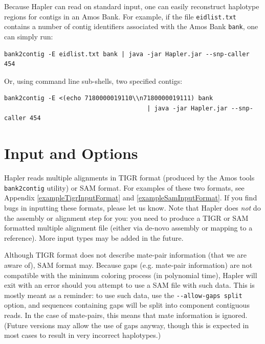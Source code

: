 \documentclass[11pt]{llncs}
\begin{document}
Because Hapler can read on standard input, one can easily reconstruct haplotype regions for contigs in an Amos Bank. 
For example, if the file \texttt{eidlist.txt} contains a number of contig identifiers
associated with the Amos Bank \texttt{bank}, one can simply run:

\begin{verbatim}
bank2contig -E eidlist.txt bank | java -jar Hapler.jar --snp-caller 454
\end{verbatim}

Or, using command line sub-shells, two specified contigs:

\begin{verbatim}
bank2contig -E <(echo 7180000019110\\n7180000019111) bank 
                                       | java -jar Hapler.jar --snp-caller 454
\end{verbatim}



\newpage

\section{Input and Options}
\label{inputAndOptions}

Hapler reads multiple alignments in TIGR format (produced by the Amos tools \verb=bank2contig= utility) or SAM format. For examples of these two 
formats, see Appendix \ref{exampleTigrInputFormat} and \ref{exampleSamInputFormat}. If you find bugs in inputting these formats, please let us know. 
Note that Hapler does \emph{not} do the assembly or alignment step for you: you need to produce a TIGR or SAM formatted multiple alignment file 
(either via de-novo assembly or mapping to a reference). More input types may be added in the future.

Although TIGR format does not describe mate-pair information (that we are aware of), SAM format may. Because gaps (e.g. mate-pair information) are 
not compatible with the minimum coloring process (in polynomial time), Hapler will exit with an error should you attempt to use a SAM file with such 
data. This is mostly meant as a reminder: to use such data, use the \verb=--allow-gaps split= option, and sequences containing gaps will be split 
into component contiguous reads. In the case of mate-pairs, this means that mate information is ignored. (Future versions may allow the use of
gaps anyway, though this is expected in most cases to result in very incorrect haplotypes.)
\end{document}
